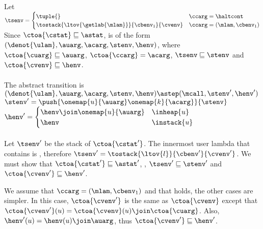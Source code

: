 \documentclass{LMCS}
\theoremstyle{definition} \newtheorem{property}[thm]{Property}
\begin{document}
\begin{enumerate}[$\bullet$]
    Let $\tsenv = 
    \begin{cases}
      \tuple{} & \ccarg = \haltcont \\
      \tostack{\ltov{\getlab{\mlam}}}{\cbenv_1}{\cvenv} 
      & \ccarg = (\mlam, \cbenv_1)
    \end{cases}$ \\
    Since $\ctoa{\cstat} \sqsubseteq \astat$, \astat{} is of the form
    $(\denot{\ulam}, \auarg, \acarg, \stenv, \henv)$, 
    where $\ctoa{\cuarg} \sqsubseteq \auarg$, $\ctoa{\ccarg} = \acarg$,
    $\tsenv \sqsubseteq \stenv$ and $\ctoa{\cvenv} \sqsubseteq \henv$.
    \\ \\
    The abstract transition is \\
    $(\denot{\ulam}, \auarg, \acarg, \stenv, \henv) \astep 
    (\mcall, \stenv', \henv')$ \\
    $\stenv' = \push{\onemap{u}{\auarg} \onemap{k}{\acarg}} {\stenv}$ \\
    $\henv' = 
    \begin{cases}
      \henv\join\onemap{u}{\auarg} & \inheap{u} \\
      \henv & \instack{u}
    \end{cases}$ \\
    \\
    Let $\tsenv'$ be the stack of $\ctoa{\cstat'}$.
    The innermost user lambda that contains \mcall{} is , therefore 
    $\tsenv' = \tostack{\ltov{l}}{\cbenv'}{\cvenv'}$.
    We must show that $\ctoa{\cstat'} \sqsubseteq \astat'$, \ie,
    $\tsenv' \sqsubseteq \stenv'$ and $\ctoa{\cvenv'} \sqsubseteq \henv'$.

    We assume that $\ccarg = (\mlam, \cbenv_1)$ and that  holds, the 
    other cases are simpler.
    In this case, $\ctoa{\cvenv'}$ is the same as $\ctoa{\cvenv}$ except that
    $\ctoa{\cvenv'}(u) = \ctoa{\cvenv}(u) \join \ctoa{\cuarg}$.
    Also, $\henv'(u) = \henv(u) \join \auarg$, thus $\ctoa{\cvenv'} 
    \sqsubseteq \henv'$.
    

\end{enumerate}
\end{document}
